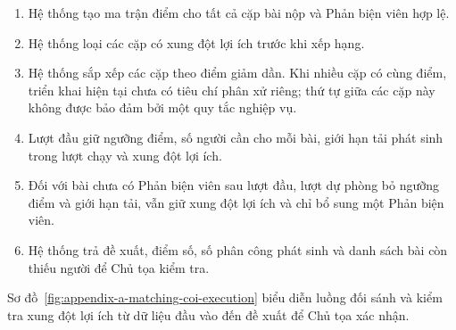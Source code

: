 \begin{enumerate}
\item Hệ thống tạo ma trận điểm cho tất cả cặp bài nộp và Phản biện viên hợp lệ.
\item Hệ thống loại các cặp có xung đột lợi ích trước khi xếp hạng.
\item Hệ thống sắp xếp các cặp theo điểm giảm dần. Khi nhiều cặp có cùng điểm, triển khai hiện tại chưa có tiêu chí phân xử riêng; thứ tự giữa các cặp này không được bảo đảm bởi một quy tắc nghiệp vụ.
\item Lượt đầu giữ ngưỡng điểm, số người cần cho mỗi bài, giới hạn tải phát sinh trong lượt chạy và xung đột lợi ích.
\item Đối với bài chưa có Phản biện viên sau lượt đầu, lượt dự phòng bỏ ngưỡng điểm và giới hạn tải, vẫn giữ xung đột lợi ích và chỉ bổ sung một Phản biện viên.
\item Hệ thống trả đề xuất, điểm số, số phân công phát sinh và danh sách bài còn thiếu người để Chủ tọa kiểm tra.
\end{enumerate}

Sơ đồ~\ref{fig:appendix-a-matching-coi-execution} biểu diễn luồng đối sánh và kiểm tra xung đột lợi ích từ dữ liệu đầu vào đến đề xuất để Chủ tọa xác nhận.

